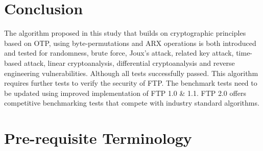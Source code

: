 \documentclass[11pt]{article}
\theoremstyle{definition}
\theoremstyle{remark}
\begin{document}
\section {Conclusion}

The algorithm proposed in this study that builds on cryptographic principles based on OTP, using byte-permutations and ARX operations is both introduced and tested for randomness, brute force, Joux's attack, related key attack, time-based attack, linear cryptoanalysis, differential cryptoanalysis and reverse engineering vulnerabilities. Although all tests successfully passed. This algorithm requires further tests to verify the security of FTP. The benchmark tests need to be updated using improved implementation of FTP 1.0 \& 1.1. FTP 2.0 offers competitive benchmarking tests that compete with industry standard algorithms.

\appendix

\section {Pre-requisite Terminology} \label{sec:term}
 
\renewcommand{\arraystretch}{2} %
\end{document}
